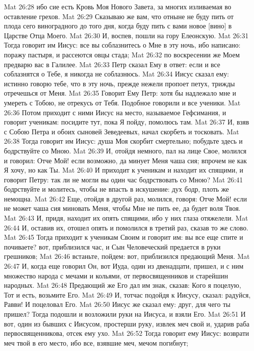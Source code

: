 Mat 26:28  ибо сие есть Кровь Моя Нового Завета, за многих изливаемая во оставление грехов.
Mat 26:29  Сказываю же вам, что отныне не буду пить от плода сего виноградного до того дня, когда буду пить с вами новое [вино] в Царстве Отца Моего.
Mat 26:30  И, воспев, пошли на гору Елеонскую.
Mat 26:31  Тогда говорит им Иисус: все вы соблазнитесь о Мне в эту ночь, ибо написано: поражу пастыря, и рассеются овцы стада;
Mat 26:32  по воскресении же Моем предварю вас в Галилее.
Mat 26:33  Петр сказал Ему в ответ: если и все соблазнятся о Тебе, я никогда не соблазнюсь.
Mat 26:34  Иисус сказал ему: истинно говорю тебе, что в эту ночь, прежде нежели пропоет петух, трижды отречешься от Меня.
Mat 26:35  Говорит Ему Петр: хотя бы надлежало мне и умереть с Тобою, не отрекусь от Тебя. Подобное говорили и все ученики.
Mat 26:36  Потом приходит с ними Иисус на место, называемое Гефсимания, и говорит ученикам: посидите тут, пока Я пойду, помолюсь там.
Mat 26:37  И, взяв с Собою Петра и обоих сыновей Зеведеевых, начал скорбеть и тосковать.
Mat 26:38  Тогда говорит им Иисус: душа Моя скорбит смертельно; побудьте здесь и бодрствуйте со Мною.
Mat 26:39  И, отойдя немного, пал на лице Свое, молился и говорил: Отче Мой! если возможно, да минует Меня чаша сия; впрочем не как Я хочу, но как Ты.
Mat 26:40  И приходит к ученикам и находит их спящими, и говорит Петру: так ли не могли вы один час бодрствовать со Мною?
Mat 26:41  бодрствуйте и молитесь, чтобы не впасть в искушение: дух бодр, плоть же немощна.
Mat 26:42  Еще, отойдя в другой раз, молился, говоря: Отче Мой! если не может чаша сия миновать Меня, чтобы Мне не пить ее, да будет воля Твоя.
Mat 26:43  И, придя, находит их опять спящими, ибо у них глаза отяжелели.
Mat 26:44  И, оставив их, отошел опять и помолился в третий раз, сказав то же слово.
Mat 26:45  Тогда приходит к ученикам Своим и говорит им: вы все еще спите и почиваете? вот, приблизился час, и Сын Человеческий предается в руки грешников;
Mat 26:46  встаньте, пойдем: вот, приблизился предающий Меня.
Mat 26:47  И, когда еще говорил Он, вот Иуда, один из двенадцати, пришел, и с ним множество народа с мечами и кольями, от первосвященников и старейшин народных.
Mat 26:48  Предающий же Его дал им знак, сказав: Кого я поцелую, Тот и есть, возьмите Его.
Mat 26:49  И, тотчас подойдя к Иисусу, сказал: радуйся, Равви! И поцеловал Его.
Mat 26:50  Иисус же сказал ему: друг, для чего ты пришел? Тогда подошли и возложили руки на Иисуса, и взяли Его.
Mat 26:51  И вот, один из бывших с Иисусом, простерши руку, извлек меч свой и, ударив раба первосвященникова, отсек ему ухо.
Mat 26:52  Тогда говорит ему Иисус: возврати меч твой в его место, ибо все, взявшие меч, мечом погибнут;
